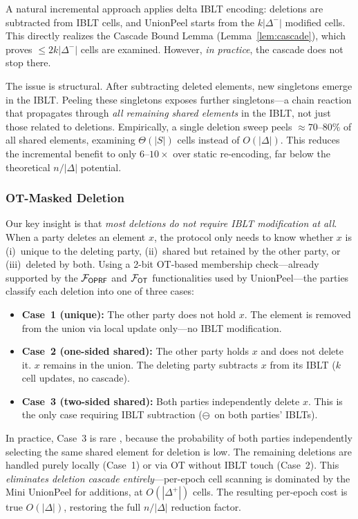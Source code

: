 A natural incremental approach applies delta IBLT encoding: deletions are
subtracted from IBLT cells, and UnionPeel starts from the $k|\Delta^-|$
modified cells. This directly realizes the Cascade Bound Lemma
(Lemma~\ref{lem:cascade}), which proves $\leq 2k|\Delta^-|$ cells are
examined. However, \emph{in practice}, the cascade does not stop there.

The issue is structural. After subtracting deleted elements, new singletons
emerge in the IBLT. Peeling these singletons exposes further singletons---a
chain reaction that propagates through \emph{all remaining shared elements}
in the IBLT, not just those related to deletions. Empirically, a single
deletion sweep peels $\approx 70$--$80\%$ of all shared elements, examining
$\Theta(|S|)$ cells instead of $O(|\Delta|)$. This reduces the incremental
benefit to only $6$--$10\times$ over static re-encoding, far below the
theoretical $n/|\Delta|$ potential.

\subsubsection{OT-Masked Deletion}

Our key insight is that \emph{most deletions do not require IBLT
modification at all}. When a party deletes an element $x$, the protocol
only needs to know whether $x$ is (i)~unique to the deleting party,
(ii)~shared but retained by the other party, or (iii)~deleted by both.
Using a 2-bit OT-based membership check---already supported by the
$\mathcal{F}_{\mathsf{OPRF}}$ and $\mathcal{F}_{\mathsf{OT}}$ functionalities used by
UnionPeel---the parties classify each deletion into one of three cases:

\begin{itemize}
\item \textbf{Case~1 (unique):} The other party does not hold $x$. The element
  is removed from the union via local update only---no IBLT modification.
\item \textbf{Case~2 (one-sided shared):} The other party holds $x$ and does
  not delete it. $x$ remains in the union. The deleting party subtracts $x$
  from its IBLT ($k$ cell updates, no cascade).
\item \textbf{Case~3 (two-sided shared):} Both parties independently delete
  $x$. This is the only case requiring IBLT subtraction ($\ominus$~on both
  parties' IBLTs).
\end{itemize}

In practice, Case~3 is rare ,
because the probability of both parties independently selecting the same
shared element for deletion is low. The remaining deletions are
handled purely locally (Case~1) or via OT without IBLT touch (Case~2). This
\emph{eliminates deletion cascade entirely}---per-epoch cell scanning is
dominated by the Mini UnionPeel for additions, at $O(|\Delta^+|)$ cells.
The resulting per-epoch cost is true $O(|\Delta|)$, restoring the full
$n/|\Delta|$ reduction factor.